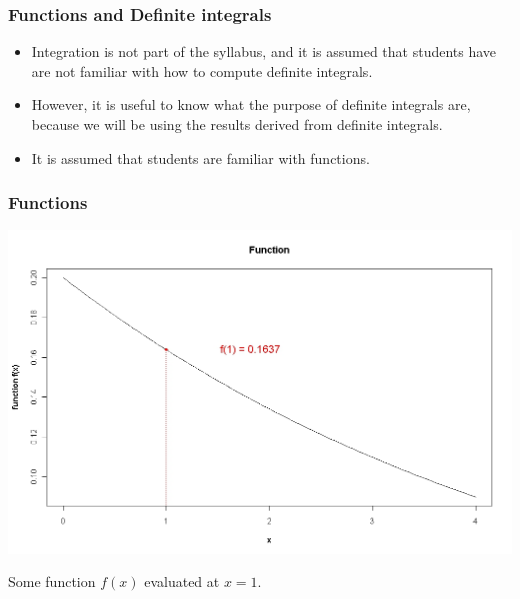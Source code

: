 \begin{frame}
\frametitle{Functions and Definite integrals}
\begin{itemize}
\item Integration is not part of the syllabus, and it is assumed that students have are not familiar with how to compute definite integrals.
\item However,  it is useful to know what the purpose of definite integrals are, because we will be using the results derived from definite integrals. \item It is assumed that students are familiar with functions.
\end{itemize}
\end{frame}
\begin{frame}
\frametitle{Functions}

\vspace{-0.5cm}

\begin{center}
\includegraphics[scale=0.30]{6AFunction}

\end{center}

Some function $f(x)$ evaluated at $x=1$.
\end{frame}
